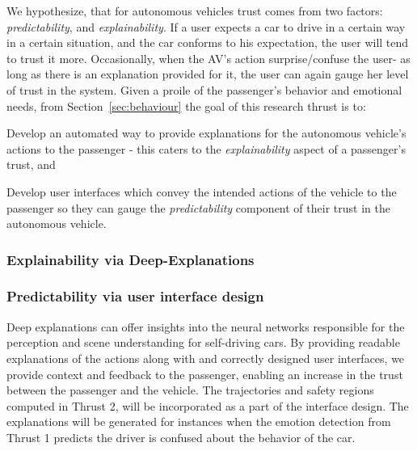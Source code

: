 We hypothesize, that for autonomous vehicles trust comes from two factors: \textit{predictability}, and \textit{explainability}.
If a user expects a car to drive in a certain way in a certain situation, and the car conforms to his expectation, the user will tend to trust it more.
Occasionally, when the AV’s action surprise/confuse the user- as long as there is an explanation provided for it, the user can again gauge her level of trust in the system.
Given a proile of the passenger's behavior and emotional needs, from Section~\ref{sec:behaviour} the goal of this research thrust is to:
\begin{enumerate*}
    \item Develop an automated way to provide explanations for the autonomous vehicle's actions to the passenger - this caters to the \textit{explainability} aspect of a passenger's trust, and
    \item Develop user interfaces which convey the intended actions of the vehicle to the passenger so they can gauge the \textit{predictability} component of their trust in the autonomous vehicle.
\end{enumerate*}





\subsubsection{Explainability via Deep-Explanations }
\label{subsec:explainability}


\subsubsection{Predictability via user interface design}
\label{subsec:uid}


Deep explanations can offer insights into the neural networks responsible for the perception and scene understanding for self-driving cars. 
By providing readable explanations of the actions along with and correctly designed user interfaces, we provide context and feedback to the passenger, enabling an increase in the trust between the passenger and the vehicle.
The trajectories and safety regions computed in Thrust 2, will be incorporated as a part of the interface design. 
The explanations will be generated for instances when the emotion detection from Thrust 1 predicts the driver is confused about the behavior of the car. 